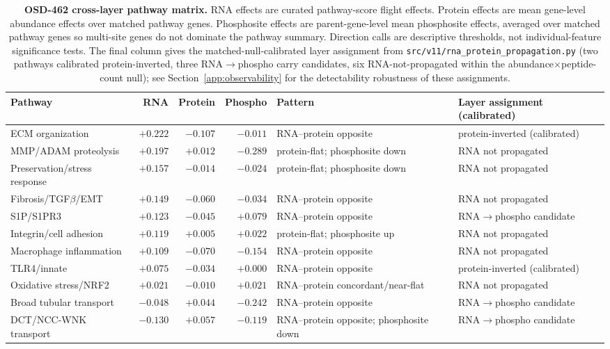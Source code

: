 \documentclass[10pt]{article}
\begin{document}
\begin{table}[H]
\centering\scriptsize
\caption{\textbf{OSD-462 cross-layer pathway matrix.} RNA effects are curated pathway-score flight effects. Protein effects are mean gene-level abundance effects over matched pathway genes. Phosphosite effects are parent-gene-level mean phosphosite effects, averaged over matched pathway genes so multi-site genes do not dominate the pathway summary. Direction calls are descriptive thresholds, not individual-feature significance tests. The final column gives the matched-null-calibrated layer assignment from \texttt{src/v11/rna\_protein\_propagation.py} (two pathways calibrated protein-inverted, three RNA$\to$phospho carry candidates, six RNA-not-propagated within the abundance$\times$peptide-count null); see Section~\ref{app:observability} for the detectability robustness of these assignments.}
\label{tab:crosslayerfull}
\begin{tabularx}{\textwidth}{p{}rrr p{} X}
\toprule
Pathway & RNA & Protein & Phospho & Pattern & Layer assignment (calibrated) \\
\midrule
ECM organization & $+0.222$ & $-0.107$ & $-0.011$ & RNA--protein opposite & protein-inverted (calibrated) \\
MMP/ADAM proteolysis & $+0.197$ & $+0.012$ & $-0.289$ & protein-flat; phosphosite down & RNA not propagated \\
Preservation/stress response & $+0.157$ & $-0.014$ & $-0.024$ & protein-flat; phosphosite down & RNA not propagated \\
Fibrosis/TGF$\beta$/EMT & $+0.149$ & $-0.060$ & $-0.034$ & RNA--protein opposite & RNA not propagated \\
S1P/S1PR3 & $+0.123$ & $-0.045$ & $+0.079$ & RNA--protein opposite & RNA$\to$phospho candidate \\
Integrin/cell adhesion & $+0.119$ & $+0.005$ & $+0.022$ & protein-flat; phosphosite up & RNA not propagated \\
Macrophage inflammation & $+0.109$ & $-0.070$ & $-0.154$ & RNA--protein opposite & RNA not propagated \\
TLR4/innate & $+0.075$ & $-0.034$ & $+0.000$ & RNA--protein opposite & protein-inverted (calibrated) \\
Oxidative stress/NRF2 & $+0.021$ & $-0.010$ & $+0.021$ & RNA--protein concordant/near-flat & RNA not propagated \\
Broad tubular transport & $-0.048$ & $+0.044$ & $-0.242$ & RNA--protein opposite & RNA$\to$phospho candidate \\
DCT/NCC-WNK transport & $-0.130$ & $+0.057$ & $-0.119$ & RNA--protein opposite; phosphosite down & RNA$\to$phospho candidate \\
\bottomrule
\end{tabularx}
\end{table}
\end{document}
